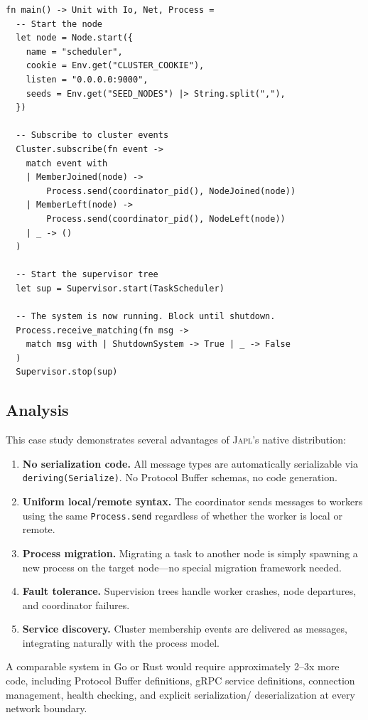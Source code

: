 \documentclass[11pt,a4paper]{article}
\newcommand{\japl}{\textsc{Japl}}
\begin{document}
\begin{lstlisting}
fn main() -> Unit with Io, Net, Process =
  -- Start the node
  let node = Node.start({
    name = "scheduler",
    cookie = Env.get("CLUSTER_COOKIE"),
    listen = "0.0.0.0:9000",
    seeds = Env.get("SEED_NODES") |> String.split(","),
  })

  -- Subscribe to cluster events
  Cluster.subscribe(fn event ->
    match event with
    | MemberJoined(node) ->
        Process.send(coordinator_pid(), NodeJoined(node))
    | MemberLeft(node) ->
        Process.send(coordinator_pid(), NodeLeft(node))
    | _ -> ()
  )

  -- Start the supervisor tree
  let sup = Supervisor.start(TaskScheduler)

  -- The system is now running. Block until shutdown.
  Process.receive_matching(fn msg ->
    match msg with | ShutdownSystem -> True | _ -> False
  )
  Supervisor.stop(sup)
\end{lstlisting}

\subsection{Analysis}

This case study demonstrates several advantages of \japl{}'s native
distribution:

\begin{enumerate}[nosep]
  \item \textbf{No serialization code.} All message types are
        automatically serializable via \texttt{deriving(Serialize)}.
        No Protocol Buffer schemas, no code generation.
  \item \textbf{Uniform local/remote syntax.} The coordinator sends
        messages to workers using the same \texttt{Process.send} regardless
        of whether the worker is local or remote.
  \item \textbf{Process migration.} Migrating a task to another node is
        simply spawning a new process on the target node---no special
        migration framework needed.
  \item \textbf{Fault tolerance.} Supervision trees handle worker crashes,
        node departures, and coordinator failures.
  \item \textbf{Service discovery.} Cluster membership events are delivered
        as messages, integrating naturally with the process model.
\end{enumerate}

A comparable system in Go or Rust would require approximately 2--3x more
code, including Protocol Buffer definitions, gRPC service definitions,
connection management, health checking, and explicit serialization/
deserialization at every network boundary.
\end{document}
